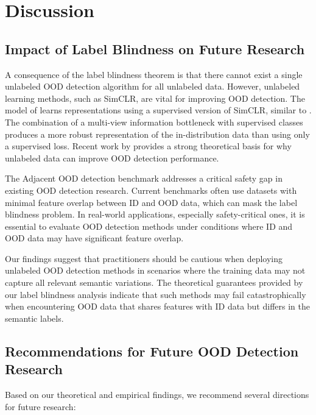 \documentclass[11pt, oneside]{book}
\theoremstyle{plain}
\theoremstyle{definition}
\theoremstyle{remark}
\begin{document}
\section{Discussion}

\subsection{Impact of Label Blindness on Future Research}

A consequence of the label blindness theorem is that there cannot exist a single unlabeled OOD detection algorithm for all unlabeled data. However, unlabeled learning methods, such as SimCLR, are vital for improving OOD detection. The model of \citet{sun2022out} learns representations using a supervised version of SimCLR, similar to \citet{khosla2020supervised}. The combination of a multi-view information bottleneck with supervised classes produces a more robust representation of the in-distribution data than using only a supervised loss. Recent work by \citet{du2024does} provides a strong theoretical basis for why unlabeled data can improve OOD detection performance.

The Adjacent OOD detection benchmark addresses a critical safety gap in existing OOD detection research. Current benchmarks often use datasets with minimal feature overlap between ID and OOD data, which can mask the label blindness problem. In real-world applications, especially safety-critical ones, it is essential to evaluate OOD detection methods under conditions where ID and OOD data may have significant feature overlap.

Our findings suggest that practitioners should be cautious when deploying unlabeled OOD detection methods in scenarios where the training data may not capture all relevant semantic variations. The theoretical guarantees provided by our label blindness analysis indicate that such methods may fail catastrophically when encountering OOD data that shares features with ID data but differs in the semantic labels.

\subsection{Recommendations for Future OOD Detection Research}

Based on our theoretical and empirical findings, we recommend several directions for future research:
\end{document}
